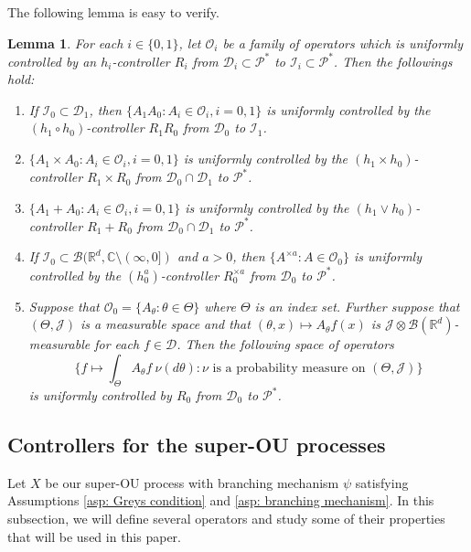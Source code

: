 \documentclass[12pt,a4paper]{amsart}
\theoremstyle{plain}
\newtheorem{lem}[thm]{Lemma}
\theoremstyle{definition}
\numberwithin{equation}{section}
\begin{document}
The following lemma is easy to verify.
\begin{lem}
  \label{lem: property of controllable operators}
  For each $i \in \{0,1\}$, let $\mathscr O_i$ be a family of operators which is  uniformly controlled by an $h_i$-controller $R_i$ from $\mathcal D_i \subset \mathcal P^*$ to $ \mathcal I_i \subset \mathcal P^*$.
  Then the followings hold:
  \begin{enumerate}
  \item
    If $\mathcal I_0 \subset \mathcal D_1$, then $\{A_1A_0: A_i \in \mathscr O_i, i = 0,1\}$ is uniformly controlled by the $(h_1 \circ h_0)$-controller $R_1R_0$ from $\mathcal D_0$ to $\mathcal I_1$.
  \item
    $\{ A_1 \times A_0: A_i \in \mathscr O_i, i = 0,1\}$ is uniformly controlled by the $(h_1\times h_0)$-controller $R_1 \times R_0$ from $\mathcal D_0 \cap \mathcal D_1$ to $\mathcal P^*$.
  \item
    $\{ A_1 + A_0: A_i \in \mathscr O_i, i = 0,1\}$ is uniformly controlled by the $(h_1 \vee h_0)$-controller $R_1 + R_0$ from $\mathcal D_0 \cap \mathcal D_1$ to $\mathcal P^*$.
  \item
    If $\mathcal I_0 \subset \mathcal B(\mathbb R^d, \mathbb C \setminus (\infty, 0])$ and $a>0$, then $\{A^{\times a} : A \in \mathscr O_0\}$ is uniformly controlled by the $(h_0^a)$-controller $R_0^{\times a}$ from $\mathcal D_0$ to $\mathcal P^*$.
  \item
    Suppose that $\mathscr O_0 = \{A_\theta: \theta \in \Theta \}$ where $\Theta$ is an index set.
    Further suppose that $(\Theta, \mathcal J )$ is a measurable space and that $(\theta,x) \mapsto A_\theta f(x)$ is $\mathcal J \otimes \mathcal B(\mathbb R^d)$-measurable for each $f\in \mathcal D$.
    Then the following space of operators
    \[
      \Big\{ f \mapsto \int_{\Theta} A_\theta f~\nu(d\theta) : \nu \text{ is a probability measure on } (\Theta, \mathcal J) \Big\}
    \]
    is uniformly controlled by $R_0$ from $\mathcal D_0$ to $\mathcal P^*$.
  \end{enumerate}
\end{lem}

\subsection{Controllers for the super-OU processes}
\label{sec: h-controller}
Let $X$ be our super-OU process with branching mechanism $\psi$ satisfying
Assumptions \ref{asp: Greys condition} and \ref{asp: branching mechanism}.
In this subsection, we will define several operators and study some of their properties that will be used in this paper.
\end{document}
